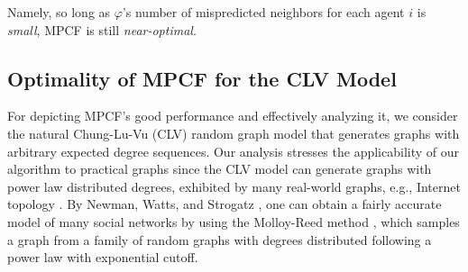 \documentclass[letterpaper]{article} %
\begin{document}
Namely, so long as $\varphi$'s number of mispredicted neighbors for each agent $i$ is \textit{small}, MPCF is still \textit{near-optimal}.


%

\subsection{Optimality of MPCF for the CLV Model}
\label{sec:Optimality of MPCF for the CLV Model}
For depicting MPCF’s good performance and effectively analyzing it, we consider the natural Chung-Lu-Vu (CLV) random graph model \cite{chung2004spectra} that generates graphs with arbitrary expected degree sequences. Our analysis stresses the applicability of our algorithm to practical graphs since the CLV model can generate graphs with power law distributed degrees, exhibited by many real-world graphs, e.g., Internet topology \cite{chung2004spectra}. By Newman, Watts, and Strogatz , one can obtain a fairly accurate model of many social networks by using the Molloy-Reed method \cite{molloy1995critical}, which samples a graph from a family of random graphs with degrees distributed following a power law with exponential cutoff. 

%

\end{document}

